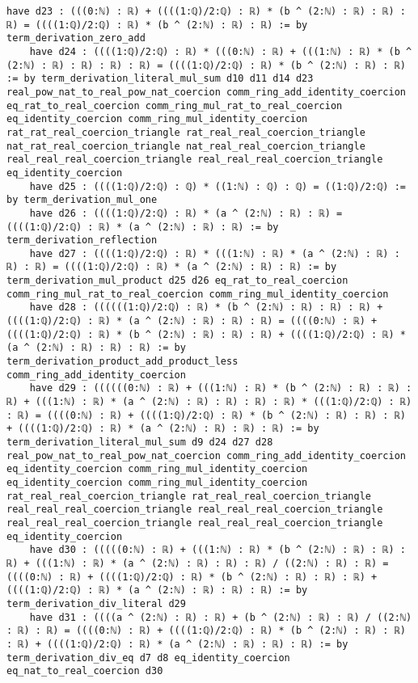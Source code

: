 \documentclass{article}
\begin{document}
\begin{tcolorbox}[colback=white!10, width=\linewidth]
\begin{lstlisting}[language=Lean4]
    have d23 : (((0:ℕ) : ℝ) + ((((1:ℚ)/2:ℚ) : ℝ) * (b ^ (2:ℕ) : ℝ) : ℝ) : ℝ) = ((((1:ℚ)/2:ℚ) : ℝ) * (b ^ (2:ℕ) : ℝ) : ℝ) := by term_derivation_zero_add
    have d24 : ((((1:ℚ)/2:ℚ) : ℝ) * (((0:ℕ) : ℝ) + (((1:ℕ) : ℝ) * (b ^ (2:ℕ) : ℝ) : ℝ) : ℝ) : ℝ) = ((((1:ℚ)/2:ℚ) : ℝ) * (b ^ (2:ℕ) : ℝ) : ℝ) := by term_derivation_literal_mul_sum d10 d11 d14 d23 real_pow_nat_to_real_pow_nat_coercion comm_ring_add_identity_coercion eq_rat_to_real_coercion comm_ring_mul_rat_to_real_coercion eq_identity_coercion comm_ring_mul_identity_coercion rat_rat_real_coercion_triangle rat_real_real_coercion_triangle nat_rat_real_coercion_triangle nat_real_real_coercion_triangle real_real_real_coercion_triangle real_real_real_coercion_triangle eq_identity_coercion
    have d25 : ((((1:ℚ)/2:ℚ) : ℚ) * ((1:ℕ) : ℚ) : ℚ) = ((1:ℚ)/2:ℚ) := by term_derivation_mul_one
    have d26 : ((((1:ℚ)/2:ℚ) : ℝ) * (a ^ (2:ℕ) : ℝ) : ℝ) = ((((1:ℚ)/2:ℚ) : ℝ) * (a ^ (2:ℕ) : ℝ) : ℝ) := by term_derivation_reflection
    have d27 : ((((1:ℚ)/2:ℚ) : ℝ) * (((1:ℕ) : ℝ) * (a ^ (2:ℕ) : ℝ) : ℝ) : ℝ) = ((((1:ℚ)/2:ℚ) : ℝ) * (a ^ (2:ℕ) : ℝ) : ℝ) := by term_derivation_mul_product d25 d26 eq_rat_to_real_coercion comm_ring_mul_rat_to_real_coercion comm_ring_mul_identity_coercion
    have d28 : ((((((1:ℚ)/2:ℚ) : ℝ) * (b ^ (2:ℕ) : ℝ) : ℝ) : ℝ) + ((((1:ℚ)/2:ℚ) : ℝ) * (a ^ (2:ℕ) : ℝ) : ℝ) : ℝ) = ((((0:ℕ) : ℝ) + ((((1:ℚ)/2:ℚ) : ℝ) * (b ^ (2:ℕ) : ℝ) : ℝ) : ℝ) + ((((1:ℚ)/2:ℚ) : ℝ) * (a ^ (2:ℕ) : ℝ) : ℝ) : ℝ) := by term_derivation_product_add_product_less comm_ring_add_identity_coercion
    have d29 : ((((((0:ℕ) : ℝ) + (((1:ℕ) : ℝ) * (b ^ (2:ℕ) : ℝ) : ℝ) : ℝ) + (((1:ℕ) : ℝ) * (a ^ (2:ℕ) : ℝ) : ℝ) : ℝ) : ℝ) * (((1:ℚ)/2:ℚ) : ℝ) : ℝ) = ((((0:ℕ) : ℝ) + ((((1:ℚ)/2:ℚ) : ℝ) * (b ^ (2:ℕ) : ℝ) : ℝ) : ℝ) + ((((1:ℚ)/2:ℚ) : ℝ) * (a ^ (2:ℕ) : ℝ) : ℝ) : ℝ) := by term_derivation_literal_mul_sum d9 d24 d27 d28 real_pow_nat_to_real_pow_nat_coercion comm_ring_add_identity_coercion eq_identity_coercion comm_ring_mul_identity_coercion eq_identity_coercion comm_ring_mul_identity_coercion rat_real_real_coercion_triangle rat_real_real_coercion_triangle real_real_real_coercion_triangle real_real_real_coercion_triangle real_real_real_coercion_triangle real_real_real_coercion_triangle eq_identity_coercion
    have d30 : (((((0:ℕ) : ℝ) + (((1:ℕ) : ℝ) * (b ^ (2:ℕ) : ℝ) : ℝ) : ℝ) + (((1:ℕ) : ℝ) * (a ^ (2:ℕ) : ℝ) : ℝ) : ℝ) / ((2:ℕ) : ℝ) : ℝ) = ((((0:ℕ) : ℝ) + ((((1:ℚ)/2:ℚ) : ℝ) * (b ^ (2:ℕ) : ℝ) : ℝ) : ℝ) + ((((1:ℚ)/2:ℚ) : ℝ) * (a ^ (2:ℕ) : ℝ) : ℝ) : ℝ) := by term_derivation_div_literal d29
    have d31 : ((((a ^ (2:ℕ) : ℝ) : ℝ) + (b ^ (2:ℕ) : ℝ) : ℝ) / ((2:ℕ) : ℝ) : ℝ) = ((((0:ℕ) : ℝ) + ((((1:ℚ)/2:ℚ) : ℝ) * (b ^ (2:ℕ) : ℝ) : ℝ) : ℝ) + ((((1:ℚ)/2:ℚ) : ℝ) * (a ^ (2:ℕ) : ℝ) : ℝ) : ℝ) := by term_derivation_div_eq d7 d8 eq_identity_coercion eq_nat_to_real_coercion d30

\end{lstlisting}
\end{tcolorbox}
\end{document}

